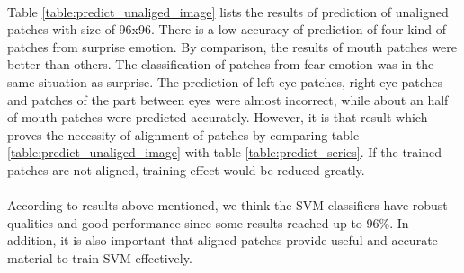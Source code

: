 \\
Table \ref{table:predict_unaliged_image} lists the results of prediction of unaligned patches with size of 96x96. There is a low accuracy of prediction of four kind of patches from surprise emotion. By comparison, the results of mouth patches were better than others. The classification of patches from fear emotion was in the same situation as surprise. The prediction of left-eye patches, right-eye patches and patches of the part between eyes were almost incorrect, while about an half of mouth patches were predicted accurately. However, it is that result which proves the necessity of alignment of patches by comparing table \ref{table:predict_unaliged_image} with table \ref{table:predict_series}. If the trained patches are not aligned, training effect would be reduced greatly.
\\
\\
According to results above mentioned, we think the SVM classifiers have robust qualities and good performance since some results reached up to 96\%. In addition, it is also important that aligned patches provide useful and accurate material to train SVM effectively.
